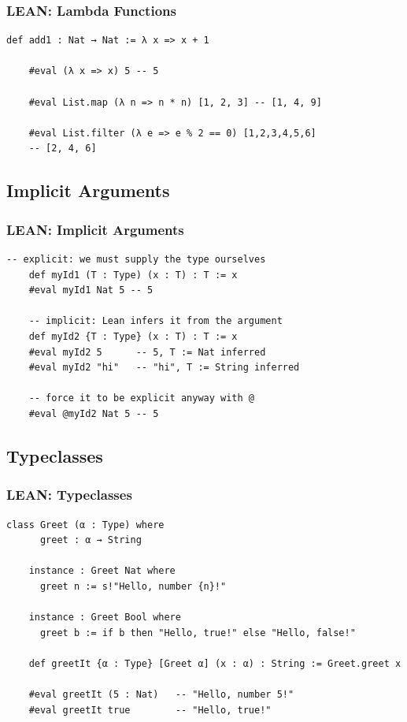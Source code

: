 \documentclass{beamer}
\begin{document}
\begin{frame}[fragile]
  \frametitle{LEAN: Lambda Functions}

  \begin{lstlisting}[language=lean]
    def add1 : Nat → Nat := λ x => x + 1

    #eval (λ x => x) 5 -- 5

    #eval List.map (λ n => n * n) [1, 2, 3] -- [1, 4, 9]

    #eval List.filter (λ e => e % 2 == 0) [1,2,3,4,5,6]
    -- [2, 4, 6]

  \end{lstlisting}
\end{frame}

\subsection{Implicit Arguments}

\begin{frame}[fragile]
  \frametitle{LEAN: Implicit Arguments}

  \begin{lstlisting}[language=lean]
    -- explicit: we must supply the type ourselves
    def myId1 (T : Type) (x : T) : T := x
    #eval myId1 Nat 5 -- 5

    -- implicit: Lean infers it from the argument
    def myId2 {T : Type} (x : T) : T := x
    #eval myId2 5      -- 5, T := Nat inferred
    #eval myId2 "hi"   -- "hi", T := String inferred

    -- force it to be explicit anyway with @
    #eval @myId2 Nat 5 -- 5
  \end{lstlisting}
\end{frame}

\subsection{Typeclasses}

\begin{frame}[fragile]
  \frametitle{LEAN: Typeclasses}

  \begin{lstlisting}[language=lean]
    class Greet (α : Type) where
      greet : α → String

    instance : Greet Nat where
      greet n := s!"Hello, number {n}!"

    instance : Greet Bool where
      greet b := if b then "Hello, true!" else "Hello, false!"

    def greetIt {α : Type} [Greet α] (x : α) : String := Greet.greet x

    #eval greetIt (5 : Nat)   -- "Hello, number 5!"
    #eval greetIt true        -- "Hello, true!"
  \end{lstlisting}

\end{frame}
\end{document}
